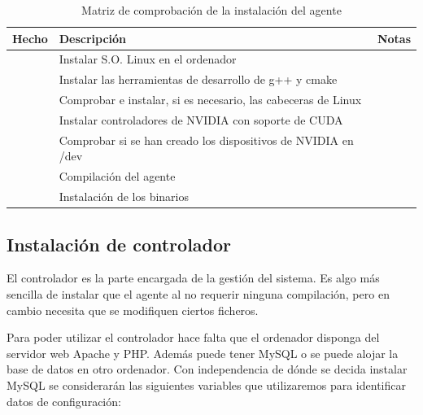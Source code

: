 \begin{table}
	\centering
	
	\begin{tabular}{|c|p{5.6cm}|p{5.6cm}|}
	\hline
	Hecho & Descripción & Notas\\
	\hline
	& Instalar S.O. Linux en el ordenador & \\
	\hline
	& Instalar las herramientas de desarrollo de g++ y cmake & \\
	\hline
	& Comprobar e instalar, si es necesario, las cabeceras de Linux & \\
	\hline
	& Instalar controladores de NVIDIA con soporte de CUDA & \\
	\hline
	& Comprobar si se han creado los dispositivos de NVIDIA en /dev & \\
	\hline
	& Compilación del agente & \\
	\hline
	& Instalación de los binarios &\\
	\hline
	\end{tabular}
	
	\caption{Matriz de comprobación de la instalación del agente}\label{tab:mat_agente}
\end{table}

\subsection{Instalación de controlador}

El controlador es la parte encargada de la gestión del sistema. Es algo más sencilla de instalar que el agente al no requerir ninguna compilación, pero en cambio necesita que se modifiquen ciertos ficheros.

Para poder utilizar el controlador hace falta que el ordenador disponga del servidor web Apache y PHP. Además puede tener MySQL o se puede alojar la base de datos en otro ordenador. Con independencia de dónde se decida instalar MySQL se considerarán las siguientes variables que utilizaremos para identificar datos de configuración:

